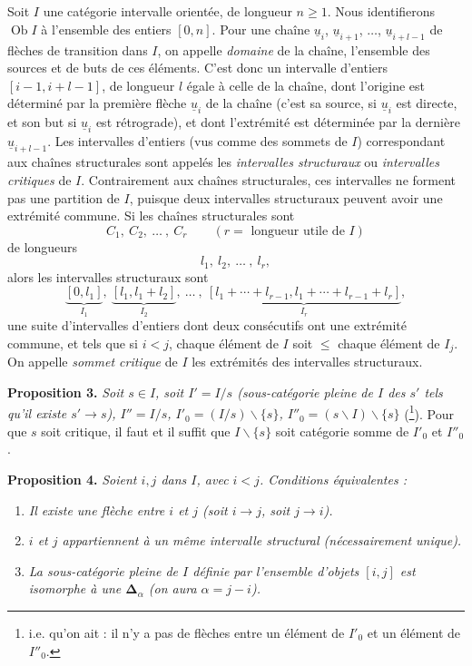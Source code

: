 \documentclass[11pt]{article}
\newcommand{\msp}[1]{\marginpar{\footnotesize [#1]}}
\newcommand{\bD}{\boldsymbol{\Delta}}
\begin{document}
Soit $I$ une catégorie intervalle orientée, de longueur $n \geq 1$. Nous identifierons $\operatorname{Ob} I$ à l'ensemble des entiers $[0,n]$. Pour une chaîne $\underline{u}_i$, $\underline{u}_{i+1}$, $\ldots$, $\underline{u}_{i+l-1}$ de flèches de transition dans $I$, on appelle \textit{domaine} de la chaîne, l'ensemble des sources et de buts de ces éléments. C'est donc un intervalle d'entiers $[i-1, i+l-1]$, de longueur $l$ égale à celle de la chaîne, dont l'origine est déterminé %
par la première flèche $\underline{u}_i$ de la chaîne (c'est sa source, si $\underline{u}_i$ est directe, et son but si $\underline{u}_i$ est rétrograde), et dont l'extrémité est déterminée par la dernière $\underline{u}_{i+l-1}$. Les intervalles d'entiers (vus comme des sommets de $I$) correspondant aux chaînes structurales sont appelés les \textit{intervalles structuraux} ou \textit{intervalles critiques} de $I$. Contrairement aux chaînes structurales, ces intervalles ne forment pas une partition de $I$, puisque deux intervalles structuraux peuvent avoir une extrémité commune. Si les chaînes structurales sont
\[
C_1,\ C_2,\ \ldots\ ,\ C_r \qquad (r = \text{ longueur utile de } I)
\]
de longueurs
\[
l_1,\ l_2,\ \ldots\ ,\ l_r,
\]
alors les intervalles structuraux sont
\[
\underbrace{[0,l_1]}_{I_1},\ \underbrace{[l_1,l_1+l_2]}_{I_2},\ \ldots\ ,\ \underbrace{[l_1+\cdots+l_{r-1},l_1+\cdots+l_{r-1}+l_r]}_{I_r},
\]
une suite d'intervalles d'entiers dont deux consécutifs ont une extrémité commune, et tels que si $i < j$, chaque élément de $I$ %
soit $\leq$ chaque élément de $I_j$. On appelle \textit{sommet critique} de $I$ les extrémités des intervalles structuraux.

\textbf{Proposition 3.} \textit{Soit $s \in I$, soit $I' = I/s$ (sous-catégorie pleine de $I$ des $s'$ tels qu'il existe $s' \longrightarrow s$), $I'' = I/s$, $I'_0 = (I/s)\backslash\{s\}$, $I''_0 = (s\backslash I)\backslash\{s\}$} (\footnote[3]{i.e. qu'on ait : il n'y a pas de flèches entre un élément de $I'_0$ et un élément de $I''_0$.}). Pour que $s$ soit critique, il faut et il suffit que $I\backslash\{s\}$ soit catégorie somme de $I'_0$ et $I''_0$.

\msp{page 11}

\textbf{Proposition 4.} \textit{Soient $i,j$ dans $I$, avec $i < j$. Conditions équivalentes :}
\begin{enumerate}
\item[\textit{a)}] \textit{Il existe une flèche entre $i$ et $j$ (soit $i \longrightarrow j$, soit $j \longrightarrow i$).}
\item[\textit{b)}] \textit{$i$ et $j$ appartiennent à un même intervalle structural (nécessairement unique).}
\item[\textit{c)}] \textit{La sous-catégorie pleine de $I$ définie par l'ensemble d'objets $[i,j]$ est isomorphe à une $\bD_\alpha$ (on aura $\alpha = j-i$).}
\end{enumerate}
\end{document}
